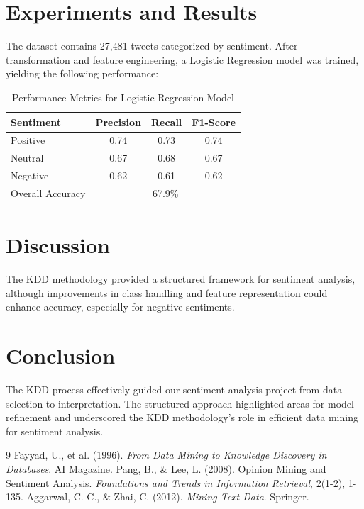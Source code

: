 \documentclass{article}
\begin{document}
\section{Experiments and Results}
The dataset contains 27,481 tweets categorized by sentiment. After transformation and feature engineering, a Logistic Regression model was trained, yielding the following performance:
\begin{table}[h]
    \centering
    \begin{tabular}{lccc}
        \hline
        Sentiment & Precision & Recall & F1-Score \\
        \hline
        Positive & 0.74 & 0.73 & 0.74 \\
        Neutral & 0.67 & 0.68 & 0.67 \\
        Negative & 0.62 & 0.61 & 0.62 \\
        \hline
        Overall Accuracy & \multicolumn{3}{c}{67.9\%} \\
        \hline
    \end{tabular}
    \caption{Performance Metrics for Logistic Regression Model}
\end{table}

\section{Discussion}
The KDD methodology provided a structured framework for sentiment analysis, although improvements in class handling and feature representation could enhance accuracy, especially for negative sentiments.

\section{Conclusion}
The KDD process effectively guided our sentiment analysis project from data selection to interpretation. The structured approach highlighted areas for model refinement and underscored the KDD methodology’s role in efficient data mining for sentiment analysis.

\begin{thebibliography}{9}
Fayyad, U., et al. (1996). \textit{From Data Mining to Knowledge Discovery in Databases}. AI Magazine.
Pang, B., \& Lee, L. (2008). Opinion Mining and Sentiment Analysis. \textit{Foundations and Trends in Information Retrieval}, 2(1-2), 1-135.
Aggarwal, C. C., \& Zhai, C. (2012). \textit{Mining Text Data}. Springer.
\end{thebibliography}
\end{document}
